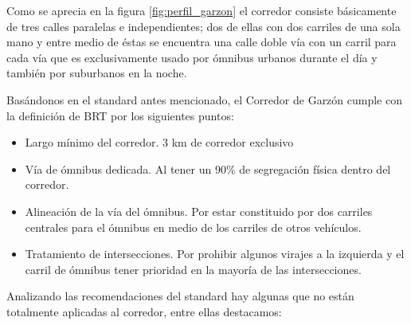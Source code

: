 Como se aprecia en la figura \ref{fig:perfil_garzon} el corredor consiste básicamente de tres calles paralelas e independientes; dos de ellas con dos carriles de una sola mano y entre medio de éstas se encuentra una calle doble vía con un carril para cada vía que es exclusivamente usado por ómnibus urbanos durante el día y también por suburbanos en la noche.


Basándonos en el standard antes mencionado, el Corredor de Garzón cumple con la definición de BRT por los siguientes puntos:
\begin{itemize}
	\item Largo mínimo del corredor. 3 km de corredor exclusivo 
	\item Vía de ómnibus dedicada. Al tener un 90\% de segregación física dentro del corredor.
	\item Alineación de la vía del ómnibus. Por estar constituido por dos carriles centrales para el ómnibus en medio de los carriles de otros vehículos.
	\item Tratamiento de intersecciones. Por prohibir algunos virajes a la izquierda y el carril de ómnibus tener prioridad en la mayoría de las intersecciones.
\end{itemize}


Analizando las recomendaciones del standard hay algunas que no están totalmente aplicadas al corredor, entre ellas destacamos:

